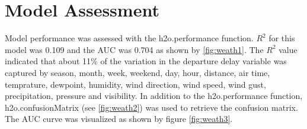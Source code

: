 \documentclass[12pt,twoside]{amherstthesis}
\begin{document}
  \begin{Shaded}
  \begin{Highlighting}[]
  \StringTok{ }\NormalTok{(}\NormalTok{(}\NormalTok{)) }
   
  \StringTok{ }\NormalTok{(} \NormalTok{, } 
                      \NormalTok{,}
           \NormalTok{, } \NormalTok{, } \NormalTok{)}
  \end{Highlighting}
  \end{Shaded}
  
  \section{Model Assessment}\label{model-assessment-1}
  
  Model performance was assessed with the h2o.performance function.
  \(R^{2}\) for this model was 0.109 and the AUC was 0.704 as shown by
  \autoref{fig:weath1}. The \(R^{2}\) value indicated that about 11\% of
  the variation in the departure delay variable was captured by season,
  month, week, weekend, day, hour, distance, air time, temprature,
  dewpoint, humidity, wind direction, wind speed, wind gust,
  precipitation, pressure and visibility. In addition to the
  h2o.performance function, h2o.confusionMatrix (see \autoref{fig:weath2})
  was used to retrieve the confusion matrix. The AUC curve was visualized
  as shown by figure \autoref{fig:weath3}.
  
  \begin{Shaded}
  \begin{Highlighting}[]
  \StringTok{ }\NormalTok{(mat$No[}\NormalTok{]+mat$Yes[}\NormalTok{])/(mat$No[}\NormalTok{]+}
  \StringTok{                                      }\NormalTok{mat$No[}\NormalTok{]+mat$Yes[}\NormalTok{]+}
  \StringTok{                                      }\NormalTok{mat$Yes[}\NormalTok{]) }
  \NormalTok{(}
  \end{Highlighting}
  \end{Shaded}
  
\end{document}
